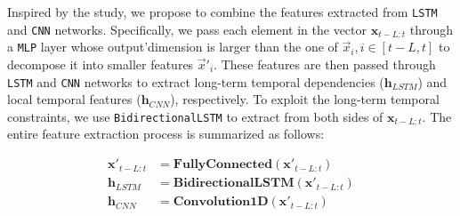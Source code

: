 \documentclass[aps,prb,groupedaddress,twocolumn,showpacs,dvipdfmx,superscriptaddress,pdftex]{revtex4-2}
\begin{document}

Inspired by the \cite{vo2017multi} study, we propose to combine the features extracted from \verb|LSTM| and \verb|CNN| networks. Specifically, we pass each element in the vector $\mathbf{x}_{t-L:t}$ through a \verb|MLP| layer whose output'dimension is larger than the one of $\vec x_i, i\in[t-L, t]$ to decompose it into smaller features $\vec x'_i$. These features are then passed through \verb|LSTM| and \verb|CNN| networks to extract long-term temporal dependencies ($\mathbf{h}_{LSTM}$) and local temporal features ($\mathbf{h}_{CNN}$), respectively. To exploit the long-term temporal constraints, we use \verb|BidirectionalLSTM| to extract from both sides of $\mathbf{x}_{t-L:t}$. The entire feature extraction process is summarized as follows:

\begin{align}
    \mathbf{x'}_{t-L:t} &= \mathbf{FullyConnected}\left( \mathbf{x'}_{t-L:t} \right)\\
    \mathbf{h}_{LSTM} &= \mathbf{BidirectionalLSTM}\left( \mathbf{x'}_{t-L:t} \right)\\
    \mathbf{h}_{CNN} &= \mathbf{Convolution1D}\left( \mathbf{x'}_{t-L:t} \right)
    \label{eq:feature}
\end{align}

\vspace{2mm}

\end{document}
